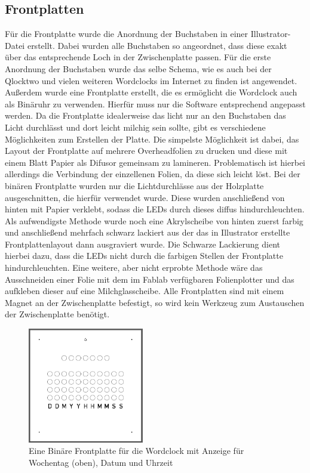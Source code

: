 \documentclass[12pt,journal,compsoc]{IEEEtran}
\begin{document}
\subsection{Frontplatten}
Für die Frontplatte wurde die Anordnung der Buchstaben in einer Illustrator-Datei erstellt. Dabei wurden alle Buchstaben so angeordnet, dass diese exakt über das entsprechende Loch in der Zwischenplatte passen. Für die erste Anordnung der Buchstaben wurde das selbe Schema, wie es auch bei der Qlocktwo und vielen weiteren Wordclocks im Internet zu finden ist angewendet. Außerdem wurde eine Frontplatte erstellt, die es ermöglicht die Wordclock auch als Binäruhr zu verwenden. Hierfür muss nur die Software entsprechend angepasst werden. Da die Frontplatte idealerweise das licht nur an den Buchstaben das Licht durchlässt und dort leicht milchig sein sollte, gibt es  verschiedene Möglichkeiten zum Erstellen der Platte. Die simpelste Möglichkeit ist dabei, das Layout der Frontplatte auf mehrere Overheadfolien zu drucken und diese mit einem Blatt Papier als Difusor gemeinsam zu lamineren. Problematisch ist hierbei allerdings die Verbindung der einzellenen Folien, da diese sich leicht löst. Bei der binären Frontplatte wurden nur die Lichtdurchlässe aus der Holzplatte ausgeschnitten, die hierfür verwendet wurde. Diese wurden anschließend von hinten mit Papier verklebt, sodass die LEDs durch dieses diffus hindurchleuchten. Als aufwendigste Methode wurde noch eine Akrylscheibe von hinten zuerst farbig und anschließend mehrfach schwarz lackiert aus der das in Illustrator erstellte Frontplattenlayout dann ausgraviert wurde. Die Schwarze Lackierung dient hierbei dazu, dass die LEDs nicht durch die farbigen Stellen der Frontplatte hindurchleuchten. Eine weitere, aber nicht erprobte Methode wäre das Ausschneiden einer Folie mit dem im Fablab verfügbaren Folienplotter und das aufkleben dieser auf eine Milchglasscheibe. Alle Frontplatten sind mit einem Magnet an der Zwischenplatte befestigt, so wird kein Werkzeug zum Austauschen der Zwischenplatte benötigt.
\begin{figure}[h]
	\centering
	\includegraphics[width=0.45\textwidth]{Bilder/Frontplatte2}
	\caption{Eine Binäre Frontplatte für die Wordclock mit Anzeige für Wochentag (oben), Datum und Uhrzeit} 
	\label{fig:Frontplatte2}
\end{figure}
\end{document}
